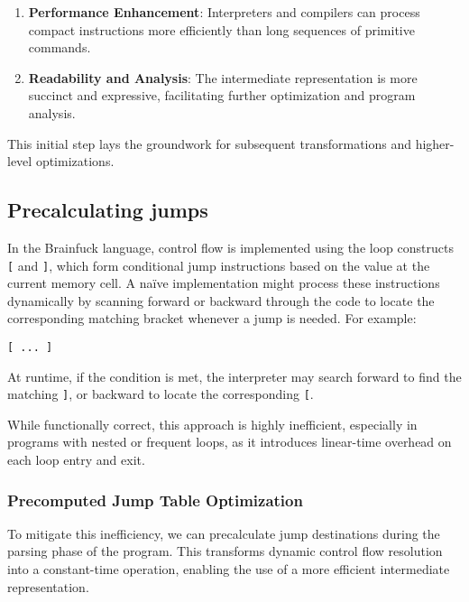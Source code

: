 \begin{enumerate}
    \item \textbf{Performance Enhancement}: Interpreters and compilers can process compact instructions more efficiently than long sequences of primitive commands.
    \item \textbf{Readability and Analysis}: The intermediate representation is more succinct and expressive, facilitating further optimization and program analysis.
\end{enumerate}

This initial step lays the groundwork for subsequent transformations and higher-level optimizations.

\subsection{Precalculating jumps}
\label{subsec:ch2sec3sec2}

\par In the Brainfuck language, control flow is implemented using the loop constructs \texttt{[} and \texttt{]}, which form conditional jump instructions based on the value at the current memory cell. A naïve implementation might process these instructions dynamically by scanning forward or backward through the code to locate the corresponding matching bracket whenever a jump is needed. For example:

\begin{verbatim}
[ ... ]
\end{verbatim}

At runtime, if the condition is met, the interpreter may search forward to find the matching \texttt{]}, or backward to locate the corresponding \texttt{[}.

While functionally correct, this approach is highly inefficient, especially in programs with nested or frequent loops, as it introduces linear-time overhead on each loop entry and exit.

\subsubsection*{Precomputed Jump Table Optimization}

To mitigate this inefficiency, we can precalculate jump destinations during the parsing phase of the program. This transforms dynamic control flow resolution into a constant-time operation, enabling the use of a more efficient intermediate representation.

